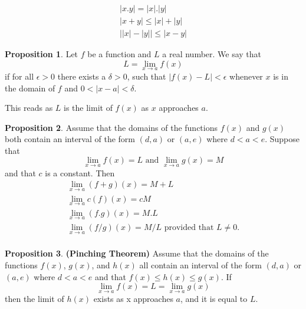 \documentclass[a4paper,twoside=off]{scrbook}
\theoremstyle{definition}
\newtheorem{proposition}{Proposition}[section]
\begin{document}
\begin{equation}
\begin{gathered}
    \lvert x . y \rvert = \lvert x \rvert . \lvert y \rvert \\
    \lvert x + y \rvert \leq \lvert x \rvert + \lvert y \rvert \\
    \lvert \lvert x \rvert - \lvert y \rvert \rvert \leq \lvert x - y \rvert
\end{gathered}
\end{equation}


\begin{proposition}
Let $f$ be a function and $L$ a real number.  We say that
\begin{equation}
    L = \lim\limits_{x \to a} f(x)
\end{equation}
if for all $\epsilon > 0$ there exists a $\delta > 0$, such that $\lvert f(x) - L \rvert < \epsilon$ whenever $x$ is in the domain of $f$ and $ 0 < \lvert x - a \rvert < \delta$.
\end{proposition}
This reads as $L$ is the limit of $f(x)$ as $x$ approaches $a$.


\begin{proposition}
Assume that the domains of the functions $f(x)$ and $g(x)$ both contain an interval of the form
$(d,a)$ or $(a,e)$ where $d < a < e$.  Suppose that
\begin{equation}
    \lim\limits_{x \to a}f(x) = L \text{   and   } \lim\limits_{x \to a}g(x) = M
\end{equation}
and that $c$ is a constant.  Then
\begin{equation}
    \begin{gathered}
        \lim\limits_{x \to a}(f+g)(x) = M + L \\
        \lim\limits_{x \to a}c(f)(x) = cM \\
        \lim\limits_{x \to a}(f . g)(x) = M . L \\
        \lim\limits_{x \to a}(f/g)(x) = M / L\text{ provided that } L \neq 0. \\
    \end{gathered}
\end{equation}
\end{proposition}

\begin{proposition}\textbf{(Pinching Theorem)}
Assume that the domains of the functions $f(x)$, $g(x)$, and $h(x)$ all contain an interval of the form $(d,a)$ or $(a,e)$ where $d < a < e$ and that $f(x) \leq h(x) \leq g(x)$.  If
\begin{equation}
    \lim\limits_{x \to a}f(x) = L = \lim\limits_{x \to a}g(x)
\end{equation}
then the limit of $h(x)$ exists as x approaches $a$, and it is equal to $L$.
\end{proposition}
\end{document}
